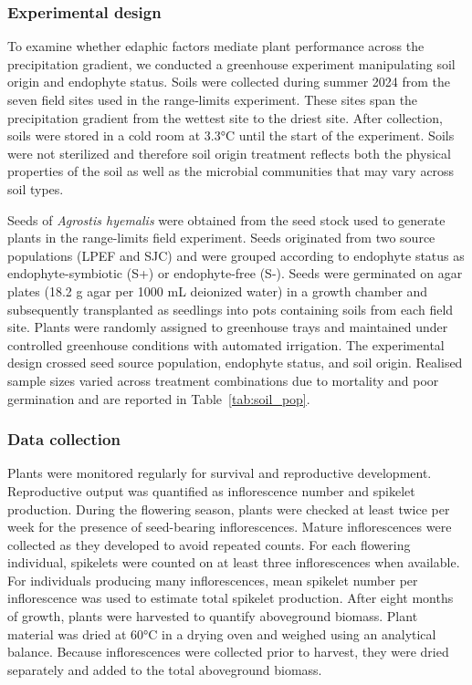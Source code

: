 \documentclass[12pt]{article}\usepackage[]{graphicx}\usepackage[dvipsnames]{xcolor}
\begin{document}
\subsubsection{Experimental design}

To examine whether edaphic factors mediate plant performance across the precipitation gradient, we conducted a greenhouse experiment
manipulating soil origin and endophyte status.
Soils were collected during summer 2024 from the seven field sites used in the range‐limits experiment.
These sites span the precipitation gradient from the wettest site to the driest site. 
After collection, soils were stored in a cold room at 3.3°C until the start of the experiment. 
Soils were not sterilized and therefore soil origin treatment reflects both the physical properties of the soil as well as the microbial communities that may vary across soil types.

Seeds of \textit{Agrostis hyemalis} were obtained from the seed stock used to generate plants in the range-limits field experiment. 
Seeds originated from two source populations (LPEF and SJC) and were grouped according to endophyte status as endophyte-symbiotic (S+) or endophyte-free (S-).
Seeds were germinated on agar plates (18.2 g agar per 1000 mL deionized water) in a growth chamber and subsequently transplanted as seedlings
into pots containing soils from each field site. 
Plants were randomly assigned to greenhouse trays and maintained under controlled greenhouse conditions with automated irrigation.
The experimental design crossed seed source population, endophyte status, and soil origin. 
Realised sample sizes varied across treatment combinations due to mortality and poor germination and are reported in Table~\ref{tab:soil_pop}.

\subsubsection {Data collection}

Plants were monitored regularly for survival and reproductive development. 
Reproductive output was quantified as inflorescence number and spikelet production. 
During the flowering season, plants were checked at least twice per week for the presence of seed-bearing inflorescences. 
Mature inflorescences were collected as they developed to avoid repeated counts. 
For each flowering individual, spikelets were counted on at least three inflorescences when available.
For individuals producing many inflorescences, mean spikelet number per inflorescence was used to estimate total spikelet production.
After eight months of growth, plants were harvested to quantify aboveground biomass. 
Plant material was dried at 60°C in a drying oven and weighed using an analytical balance. 
Because inflorescences were collected prior to harvest, they were dried separately and added to the total aboveground biomass.
\end{document}

